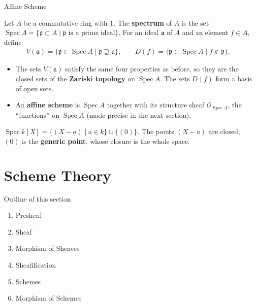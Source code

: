 \documentclass[10pt,aspectratio=1610]{beamer}
\DeclareMathOperator{\Spec}{Spec}
\newcommand{\OO}{\mathcal{O}}
\newcommand{\pp}{\mathfrak{p}}
\newcommand{\aaa}{\mathfrak{a}}
\begin{document}
    \begin{frame}{Affine Scheme}
        \begin{definition}
            Let $A$ be a commutative ring with $1$. The \textbf{spectrum} of $A$ is the set $\Spec A = \{\pp \subset A \mid \pp \text{ is a prime ideal}\}$. For an ideal $\aaa$ of $A$ and an element $f \in A$, define
            \begin{align*}
                V(\aaa) = \{\pp \in \Spec A \mid \pp \supseteq \aaa\}, \qquad D(f) = \{\pp \in \Spec A \mid f \notin \pp\}.
            \end{align*}
        \end{definition}
        \begin{itemize}
            \item The sets $V(\aaa)$ satisfy the same four properties as before, so they are the closed sets of the \textbf{Zariski topology} on $\Spec A$. The sets $D(f)$ form a basis of open sets.
            \item An \textbf{affine scheme} is $\Spec A$ together with its structure sheaf $\OO_{\Spec A}$, the ``functions'' on $\Spec A$ (made precise in the next section).
        \end{itemize}
        \begin{example}
            $\Spec k[X] = \{(X - a) \mid a \in k\} \cup \{(0)\}$. The points $(X-a)$ are closed; $(0)$ is the \textbf{generic point}, whose closure is the whole space.
        \end{example}
    \end{frame}

    \section{Scheme Theory}

    \begin{frame}{Outline of this section}
        \begin{enumerate}
            \item Presheaf
            \item Sheaf
            \item Morphism of Sheaves
            \item Sheafification
            \item Schemes
            \item Morphism of Schemes
        \end{enumerate}
    \end{frame}
\end{document}

